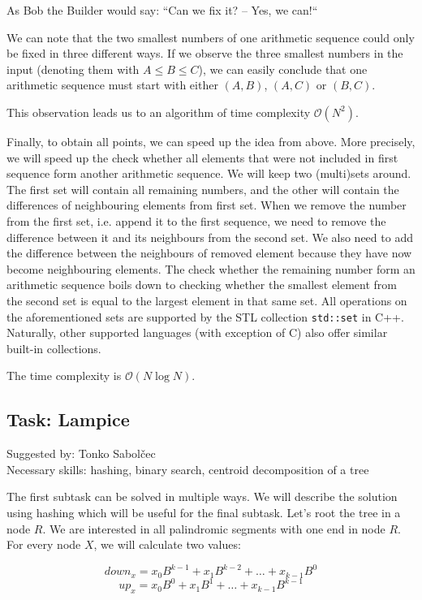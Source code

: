 \documentclass[a4paper]{article}
\begin{document}
As Bob the Builder would say: ``Can we fix it? -- Yes, we can!``

We can note that the two smallest numbers of one arithmetic sequence could only
be fixed in three different ways. If we observe the three smallest numbers in
the input (denoting them with $A \le B \le C$), we can easily conclude that one
arithmetic sequence must start with either $(A, B)$, $(A, C)$ or $(B, C)$.

This observation leads us to an algorithm of time complexity $\mathcal{O}(N^2)$.

Finally, to obtain all points, we can speed up the idea from above. More
precisely, we will speed up the check whether all elements that were
not included in first sequence form another arithmetic sequence. We will
keep two (multi)sets around. The first set will contain all remaining numbers, and
the other will contain the differences of neighbouring elements from first
set. When we remove the number from the first set, i.e. append it to the
first sequence, we need to remove the difference between it and its neighbours
from the second set. We also need to add the difference between the neighbours
of removed element because they have now become neighbouring elements. The check
whether the remaining number form an arithmetic sequence boils down to checking
whether the smallest element from the second set is equal to the largest element
in that same set. All operations on the aforementioned sets are supported
by the STL collection \texttt{std::set} in C++. Naturally, other supported
languages (with exception of C) also offer similar built-in collections.

The time complexity is $\mathcal{O}(N \log N)$.

\subsection*{Task: Lampice}
\textsf{Suggested by: Tonko Sabolčec}\\
\textsf{Necessary skills: hashing, binary search, centroid decomposition of a
tree}

The first subtask can be solved in multiple ways. We will describe the solution
using hashing which will be useful for the final subtask. Let's root the tree
in a node $R$. We are interested in all palindromic segments with one end in
node $R$. For every node $X$, we will calculate two values:

\[down_x = x_0B^{k-1} + x_1B^{k-2} + \dots + x_{k-1}B^0\]
\[up_x = x_0B^0 + x_1B^1 + \dots + x_{k-1}B^{k-1}\]
\end{document}
